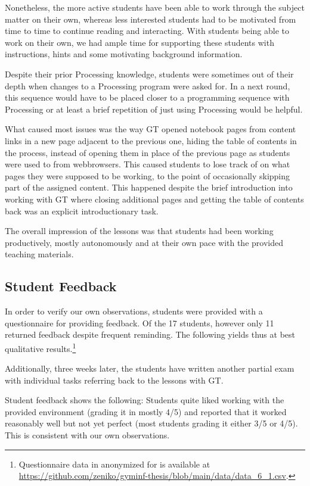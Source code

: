 Nonetheless, the more active students have been able to work through the subject matter on their own, whereas less interested students had to be motivated from time to time to continue reading and interacting. With students being able to work on their own, we had ample time for supporting these students with instructions, hints and some motivating background information.

Despite their prior Processing knowledge, students were sometimes out of their depth when changes to a Processing program were asked for. In a next round, this sequence would have to be placed closer to a programming sequence with Processing or at least a brief repetition of just using Processing would be helpful.

What caused most issues was the way \ac{GT} opened notebook pages from content links in a new page adjacent to the previous one, hiding the table of contents in the process, instead of opening them in place of the previous page as students were used to from webbrowsers. This caused students to lose track of on what pages they were supposed to be working, to the point of occasionally skipping part of the assigned content. This happened despite the brief introduction into working with \ac{GT} where closing additional pages and getting the table of contents back was an explicit introductionary task.

The overall impression of the lessons was that students had been working productively, mostly autonomously and at their own pace with the provided teaching materials.


\subsection{Student Feedback}

In order to verify our own observations, students were provided with a questionnaire for providing feedback. Of the 17 students, however only 11 returned feedback despite frequent reminding. The following yields thus at best qualitative results.\footnote{Questionnaire data in anonymized for is available at \url{https://github.com/zeniko/gyminf-thesis/blob/main/data/data_6_1.csv}.}

Additionally, three weeks later, the students have written another partial exam with individual tasks referring back to the lessons with \ac{GT}.

Student feedback shows the following: Students quite liked working with the provided environment (grading it in mostly 4/5) and reported that it worked reasonably well but not yet perfect (most students grading it either 3/5 or 4/5). This is consistent with our own observations.

